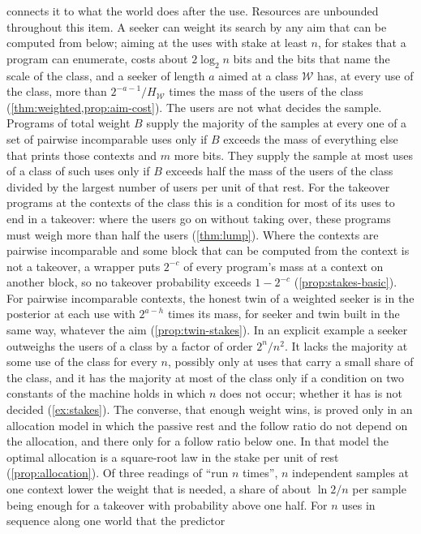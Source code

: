 \begin{enumerate}[leftmargin=1.6em,itemsep=2pt,topsep=3pt]
connects it to what the world does after the use. Resources are unbounded throughout this item. A seeker can
weight its search by any aim that can be computed from below; aiming at the uses with stake at least $n$,
for stakes that a program can enumerate, costs about $2\log_2n$ bits and the bits that name the scale of the
class, and a seeker of length $a$ aimed at a class $\mathcal W$ has, at every use of the class, more than
$2^{-a-1}/H_{\mathcal W}$ times the mass of the users of the class (\cref{thm:weighted,prop:aim-cost}). The
users are not what decides the sample. Programs of total weight $B$ supply the majority of the samples at
every one of a set of pairwise incomparable uses only if $B$ exceeds the mass of everything else that prints
those contexts and $m$ more bits. They supply the sample at most uses of a class of such uses only if $B$
exceeds half the mass of the users of the class divided by the largest number of users per unit of that
rest. For the takeover programs at the contexts of the class this is a condition for most of its uses to end
in a takeover: where the users go on without taking over, these programs must weigh more than half the users
(\cref{thm:lump}). Where the contexts are pairwise incomparable and some block that can be computed from the
context is not a takeover, a wrapper puts $2^{-c}$ of every program's mass at a context on another block, so
no takeover probability exceeds $1-2^{-c}$ (\cref{prop:stakes-basic}). For pairwise incomparable contexts,
the honest twin of a weighted seeker is in the posterior at each use with $2^{a-h}$ times its mass, for
seeker and twin built in the same way, whatever the aim (\cref{prop:twin-stakes}). In an explicit example a
seeker outweighs the users of a class by a factor of order $2^n/n^2$. It lacks the majority at some use of
the class for every $n$, possibly only at uses that carry a small share of the class, and it has the
majority at most of the class only if a condition on two constants of the machine holds in which $n$ does
not occur; whether it has is not decided (\cref{ex:stakes}). The converse, that enough weight wins, is proved
only in an allocation model in which the passive rest and the follow ratio do not depend on the allocation,
and there only for a follow ratio below one. In that model the optimal allocation is a square-root law in
the stake per unit of rest (\cref{prop:allocation}). Of three readings of ``run $n$ times'', $n$ independent
samples at one context lower the weight that is needed, a share of about $\ln2/n$ per sample being enough
for a takeover with probability above one half. For $n$ uses in sequence along one world that the predictor

\end{enumerate}
